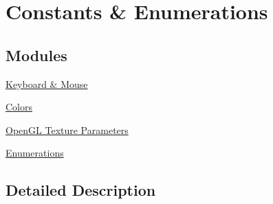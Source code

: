 \hypertarget{group____consts__enums}{\section{Constants \& Enumerations}
\label{group____consts__enums}
}
\subsection*{Modules}
\begin{DoxyCompactItemize}
\item 
\hyperlink{group____consts__key__mouse}{Keyboard \& Mouse}
\item 
\hyperlink{group____consts__color}{Colors}
\item 
\hyperlink{group____consts__ogltex}{Open\-G\-L Texture Parameters}
\item 
\hyperlink{group____enums}{Enumerations}
\end{DoxyCompactItemize}


\subsection{Detailed Description}

